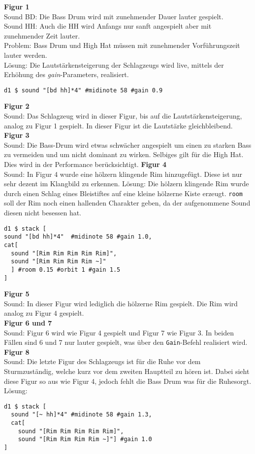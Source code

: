 \documentclass[
10pt, %
a4paper, %
oneside, %
headinclude,footinclude, %
BCOR5mm, %
]{scrartcl}
\begin{document}
\noindent \textbf{Figur 1}\\
Sound BD: Die Bass Drum wird mit zunehmender Dauer lauter gespielt.\\
Sound HH: Auch die HH wird Anfangs nur sanft angespielt aber mit zunehmender Zeit lauter.\\
Problem: Bass Drum und High Hat müssen mit zunehmender Vorführungszeit lauter werden.\\ 
Lösung: Die Lautstärkensteigerung der Schlagzeugs wird live, mittels der Erhöhung des \textit{gain}-Parameters, realisiert.
\begin{lstlisting}
d1 $ sound "[bd hh]*4" #midinote 58 #gain 0.9
\end{lstlisting}
\noindent \textbf{Figur 2}\\
Sound: Das Schlagzeug wird in dieser Figur, bis auf die Lautstärkensteigerung, analog zu Figur 1 gespielt. In dieser Figur ist die Lautstärke gleichbleibend.\\
\noindent \textbf{Figur 3}\\
Sound: Die Bass-Drum wird etwas schwächer angespielt um einen zu starken Bass zu vermeiden und um nicht dominant zu wirken. Selbiges gilt für die High Hat. Dies wird in der Performance berücksichtigt.
\noindent \textbf{Figur 4}\\
Sound: In Figur 4 wurde eine hölzern klingende Rim hinzugefügt. Diese ist nur sehr dezent im Klangbild zu erkennen.
Lösung: Die hölzern klingende Rim wurde durch einen Schlag eines Bleistiftes auf eine kleine hölzerne Kiste erzeugt. \verb|room| soll der Rim noch einen hallenden Charakter geben, da der aufgenommene Sound diesen nicht besessen hat.
 \begin{lstlisting}
d1 $ stack [
sound "[bd hh]*4"  #midinote 58 #gain 1.0,
cat[
  sound "[Rim Rim Rim Rim Rim]",
  sound "[Rim Rim Rim Rim ~]"
  ] #room 0.15 #orbit 1 #gain 1.5
]
\end{lstlisting}
\noindent \textbf{Figur 5}\\
Sound: In dieser Figur wird lediglich die hölzerne Rim gespielt. Die Rim wird analog zu Figur 4 gespielt.\\
\noindent \textbf{Figur 6 und 7}\\
Sound: Figur 6 wird wie Figur 4 gespielt und Figur 7 wie Figur 3. In beiden Fällen sind 6 und 7 nur lauter gespielt, was über den \verb|Gain|-Befehl realisiert wird.\\
\noindent \textbf{Figur 8}\\
Sound: Die letzte Figur des Schlagzeugs ist für \grqq die Ruhe vor dem Sturm\grqq zuständig, welche kurz vor dem zweiten Hauptteil zu hören ist. Dabei sieht diese Figur so aus
wie Figur 4, jedoch fehlt die Bass Drum was für die \grqq Ruhe\grqq sorgt.\\
Lösung:
\begin{lstlisting}
d1 $ stack [
  sound "[~ hh]*4" #midinote 58 #gain 1.3,
  cat[
    sound "[Rim Rim Rim Rim Rim]",
    sound "[Rim Rim Rim Rim ~]"] #gain 1.0
]
\end{lstlisting}
\end{document}
